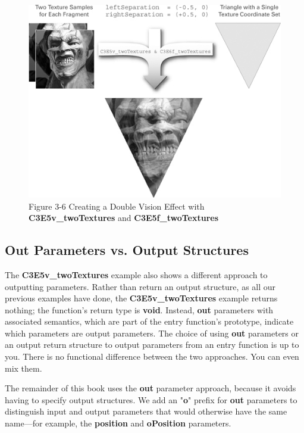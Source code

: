\documentclass{book}
\begin{document}
\begin{figure}
    \centering
    \includegraphics[width=1\linewidth]{Images/fig3_6.jpg}
    \caption{Figure 3-6 Creating a Double Vision Effect with \textbf{C3E5v_twoTextures} and \textbf{C3E5f_twoTextures}}
    \label{fig:3-6}
\end{figure}

\subsection*{Out Parameters vs. Output Structures}

The \textbf{C3E5v_twoTextures} example also shows a different approach to outputting parameters. Rather than return an output structure, as all our previous examples have done, the \textbf{C3E5v_twoTextures} example returns nothing; the function's return type is \textbf{void}. Instead, \textbf{out} parameters with associated semantics, which are part of the entry function's prototype, indicate which parameters are output parameters. The choice of using \textbf{out} parameters or an output return structure to output parameters from an entry function is up to you. There is no functional difference between the two approaches. You can even mix them.

The remainder of this book uses the \textbf{out} parameter approach, because it avoids having to specify output structures. We add an "\textbf{o}" prefix for \textbf{out} parameters to distinguish input and output parameters that would otherwise have the same name—for example, the \textbf{position} and \textbf{oPosition} parameters.
\end{document}

